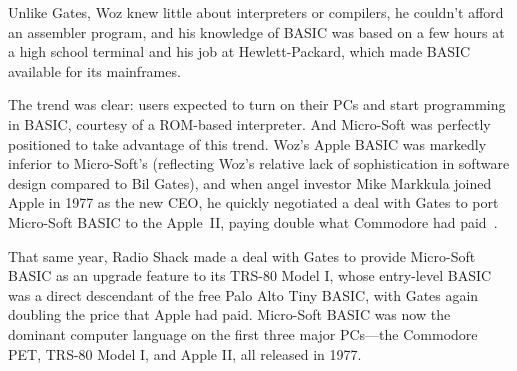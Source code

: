 \begin{tangent}
Unlike Gates, Woz knew little about interpreters or compilers, he
couldn't afford an assembler program, and his knowledge of BASIC was
based on a few hours at a high school terminal and his job at
Hewlett-Packard, which made BASIC available for its
mainframes.
\end{tangent}


The trend was clear: users expected to turn on their PCs and start
programming in BASIC, courtesy of a ROM-based interpreter.
And Micro-Soft was perfectly positioned to take advantage of this
trend.
Woz's Apple BASIC was markedly inferior to Micro-Soft's (reflecting
Woz's relative lack of sophistication in software design compared to
Bil Gates), and when angel investor Mike Markkula joined Apple in 1977
as the new CEO, he quickly negotiated a deal with Gates to port
Micro-Soft BASIC to the Apple~II, paying double what Commodore had
paid~\cite[p. 114]{commodore}.


That same year, Radio Shack made a deal with Gates to provide Micro-Soft
BASIC as an upgrade feature to its TRS-80 Model I, whose entry-level BASIC
was a direct descendant of the free Palo Alto Tiny BASIC, with Gates
again doubling the price that Apple had paid.
Micro-Soft BASIC was now the dominant computer language on the first
three major PCs---the Commodore PET, TRS-80 Model I, and Apple II, all
released in 1977.


